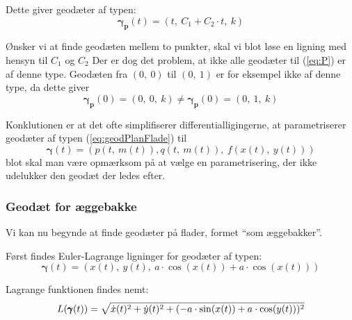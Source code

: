 Dette giver geodæter af typen:
\begin{equation*}
\pmb{\gamma_p}(t) = (t,~C_1 + C_2 \cdot t,~k)
\end{equation*}
 
 Ønsker vi at finde geodæten mellem to punkter, skal vi blot løse en ligning med hensyn til \(C_1\) og \(C_2\)
 Der er dog det problem, at ikke alle geodæter til (\ref{eq:P}) er af denne type.
 Geodæten fra \((0,~0)\) til \((0,~1)\) er for eksempel ikke af denne type, da dette giver
 \begin{equation*}
 \pmb{\gamma_p}(0) = (0,~0,~k) \neq  \pmb{\gamma_p}(0) = (0,~1,~k)
 \end{equation*}

Konklutionen er at det ofte simplifiserer differentialligingerne,
at parametriserer geodæter af typen (\ref{eq:geodPlanFlade}) til
\begin{equation*}
\pmb{\gamma}(t) = (p(t,~m(t)),q(t,~m(t)),~f(x(t),~y(t)))
\end{equation*}
blot skal man være opmærksom på at vælge en parametrisering, der ikke udelukker den geodæt der ledes efter.

\subsubsection{Geodæt for æggebakke }

Vi kan nu begynde at finde geodæter på flader, formet ``som æggebakker''.

Først findes Euler-Lagrange ligninger for geodæter af typen:
\begin{equation}\label{eq:aeggegeo}
\pmb{\gamma}(t) = (x(t),~y(t),~a\cdot\cos(x(t)) + a\cdot\cos(x(t)))
\end{equation}

Lagrange funktionen findes nemt:
\begin{equation*}
L(\pmb{\gamma}(t)) = \sqrt{\dot{x}(t)^2 + \dot{y}(t)^2 + ( -a \cdot \sin(x(t)) + a \cdot \cos(y(t)) )^2}
\end{equation*}

